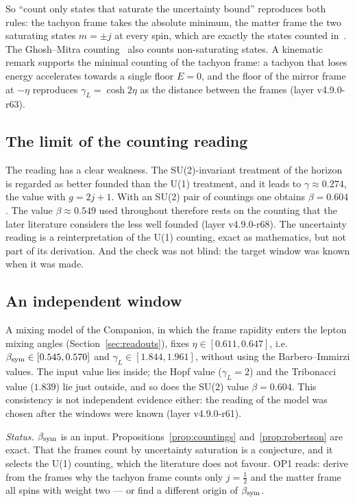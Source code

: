 So ``count only states that saturate the uncertainty bound'' reproduces both rules: the tachyon frame takes the absolute minimum, the
matter frame the two saturating states \(m=\pm j\) at every spin, which are exactly the states counted in~\cite{meissner}.  The Ghosh--Mitra
counting~\cite{ghosh} also counts non-saturating states.  A kinematic remark supports the minimal counting of the tachyon frame: a
tachyon that loses energy accelerates towards a single floor \(E=0\), and the floor of the mirror frame at \(-\eta\) reproduces
\(\gamma_L=\cosh2\eta\) as the distance between the frames (layer v4.9.0-r63).

\subsection{The limit of the counting reading}

The reading has a clear weakness.  The SU(2)-invariant treatment of the horizon~\cite{enp} is regarded as better founded than the U(1)
treatment, and it leads to \(\gamma\approx0.274\), the value with \(g=2j+1\).  With an SU(2) pair of countings one obtains
\(\beta=0.604\).  The value \(\beta\approx0.549\) used throughout therefore rests on the counting that the later literature considers the
less well founded (layer v4.9.0-r68).  The uncertainty reading is a reinterpretation of the U(1) counting, exact as mathematics, but not
part of its derivation.  And the check was not blind: the target window was known when it was made.

\subsection{An independent window}

A mixing model of the Companion, in which the frame rapidity enters the lepton mixing angles (Section~\ref{sec:readouts}), fixes
\(\eta\in[0.611,0.647]\), i.e.\ \(\beta_{\rm sym}\in[0.545,0.570]\) and \(\gamma_L\in[1.844,1.961]\), without using the Barbero--Immirzi values.
The input value lies inside; the Hopf value (\(\gamma_L=2\)) and the Tribonacci value (\(1.839\)) lie just outside, and so does the SU(2)
value \(\beta=0.604\).  This consistency is not independent evidence either: the reading of the model was chosen after the windows were
known (layer v4.9.0-r61).

\medskip\noindent\emph{Status.}  \(\beta_{\rm sym}\) is an input.  Propositions~\ref{prop:countings} and~\ref{prop:robertson} are exact.  That the
frames count by uncertainty saturation is a conjecture, and it selects the U(1) counting, which the literature does not favour.  OP1 reads:
derive from the frames why the tachyon frame counts only \(j=\tfrac12\) and the matter frame all spins with weight two --- or find a
different origin of \(\beta_{\rm sym}\).
